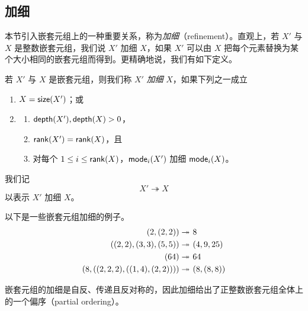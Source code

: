 \subsection{加细}\label{refinementsection}

本节引入嵌套元组上的一种重要关系，称为{\it 加细}（refinement）。直观上，若 $X'$ 与 $X$ 是整数嵌套元组，我们说 $X'$ 加细 $X$，如果 $X'$ 可以由 $X$ 把每个元素替换为某个大小相同的嵌套元组而得到。更精确地说，我们有如下定义。

\begin{definition}\label{definitionofrefinement}
若 $X'$ 与 $X$ 是嵌套元组，则我们称 $X'$ {\it 加细} $X$，如果下列之一成立
    \begin{enumerate}
    \item $X = \mathsf{size}(X')$；或
    \item 
    \begin{enumerate}
    \item $\mathsf{depth}(X'),\mathsf{depth}(X) > 0$，
    \item $\mathsf{rank}(X') = \mathsf{rank}(X)$，且
    \item 对每个 $1 \leq i \leq \mathsf{rank}(X)$，$\mathsf{mode}_i(X')$ 加细 $\mathsf{mode}_i(X)$。
    \end{enumerate}
    \end{enumerate} 
\end{definition}

\begin{notation}
我们记
\[X' \twoheadrightarrow X\]
以表示 $X'$ 加细 $X$。
\end{notation}

\begin{example}
    以下是一些嵌套元组加细的例子。
    \[\begin{aligned}
        (2,(2,2))\twoheadrightarrow &  \hspace{0.05in} 8\\
        ((2,2),(3,3),(5,5)) \twoheadrightarrow & \hspace{0.05in} (4,9,25)\\
        (64) \twoheadrightarrow & \hspace{0.05in} 64\\
        (8,((2,2,2),((1,4),(2,2)))) \twoheadrightarrow & \hspace{0.05in} (8,(8,8))
    \end{aligned}\]
\end{example}


\begin{observation}
嵌套元组的加细是自反、传递且反对称的，因此加细给出了正整数嵌套元组全体上的一个偏序（partial ordering）。
\end{observation}

